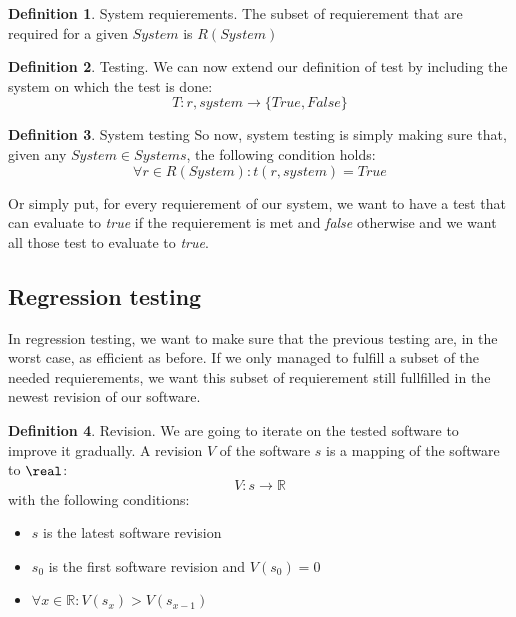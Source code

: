 \documentclass[12pt]{article}
\theoremstyle{definition}
\newtheorem{definition}{Definition}[section]
\theoremstyle{definition}
\theoremstyle{remark}
\newcommand{\R}{\mathbb{R}}
\begin{document}
\theoremstyle{definition}
\begin{definition}{System requierements.} The subset of requierement that are required for a given $System$ is $R(System)$
\end{definition}

\theoremstyle{definition}
\begin{definition}{Testing.} We can now extend our definition of test by including the system on which the test is done:
$$T: r, system \to \{True, False\}$$
\end{definition}

\theoremstyle{definition}
\begin{definition}{System testing} So now, system testing is simply making sure that, given any $System \in Systems$, the following condition holds:
$$
\forall r \in R(System): t(r, system) = True
$$
\end{definition}

Or simply put, for every requierement of our system, we want to have a test that can evaluate to \textit{true} if the requierement is met and \textit{false} otherwise and we want all those test to evaluate to \textit{true}.



\subsection{Regression testing}


In regression testing, we want to make sure that the previous testing are, in the worst case, as efficient as before. If we only managed to fulfill a subset of the needed requierements, we want this subset of requierement still fullfilled in the newest revision of our software.

\theoremstyle{definition}
\begin{definition}{Revision.} We are going to iterate on the tested software to improve it gradually. A revision $V$ of the software $s$ is a mapping of the software to $\real$:
$$
V: s \to \R
$$
with the following conditions:
\begin{itemize}
\item $s$ is the latest software revision
\item $s_0$ is the first software revision and $V(s_0) = 0$
\item $\forall x \in \R: V(s_x) > V(s_{x-1})$
\end{itemize}
\end{definition}
\end{document}
